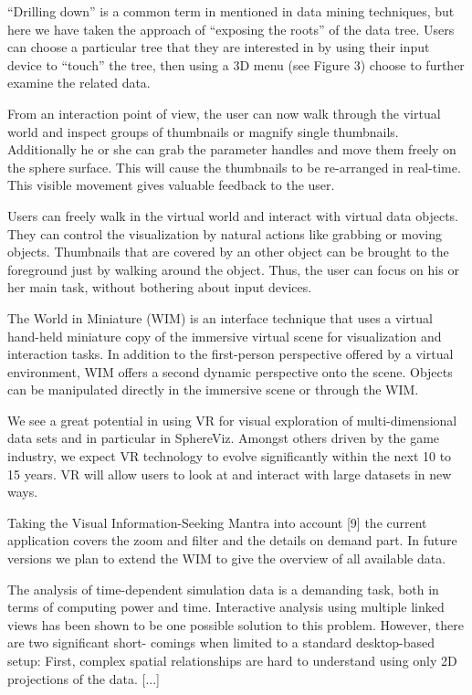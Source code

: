 “Drilling down” is a common term in mentioned in data mining techniques, but here we have taken the approach of “exposing the roots” of the data tree. Users can choose a particular tree that they are interested in by using their input device to “touch” the tree, then using a 3D menu (see Figure 3) choose to further examine the related data.
\cite{Jamieson2007}

From an interaction point of view, the user can now walk through the virtual world and inspect groups of
thumbnails or magnify single thumbnails. Additionally he or she can grab the parameter handles and move them freely on the sphere surface. This will cause the thumbnails to be re-arranged in real-time. This visible movement gives valuable feedback to the user.
\cite{Soldati2007}

Users can freely walk in the virtual world and interact with virtual data objects. They can control the visualization by natural actions like grabbing or moving objects. Thumbnails that are covered by an other object can be brought
to the foreground just by walking around the object. Thus, the user can focus on his or her main task, without bothering about input devices.
\cite{Soldati2007}

The World in Miniature (WIM) is an interface technique that uses a virtual hand-held miniature copy of the immersive virtual scene for visualization and interaction tasks. In addition to the first-person perspective offered by a virtual environment, WIM offers a second dynamic perspective onto the scene. Objects can be manipulated directly in the immersive scene or through the WIM.
\cite{Soldati2007}

We see a great potential in using VR for visual exploration of multi-dimensional data sets and in particular in SphereViz. Amongst others driven by the game industry, we expect VR technology to evolve significantly within the next 10 to 15 years. VR will allow users to look at and interact with large datasets in new ways.
\cite{Soldati2007}

Taking the Visual Information-Seeking Mantra into account [9] the current application covers the zoom and filter and the details on demand part. In future versions we plan to extend the WIM to give the overview of all available data.
\cite{Soldati2007}

The analysis of time-dependent simulation data is a demanding task, both in terms of computing power and time. Interactive analysis using multiple linked views has been shown to be one possible solution to this problem. However, there are two significant short- comings when limited to a standard desktop-based setup: First, complex spatial relationships are hard to understand using only 2D projections of the data. [...]
\cite{Hentschel2009}

